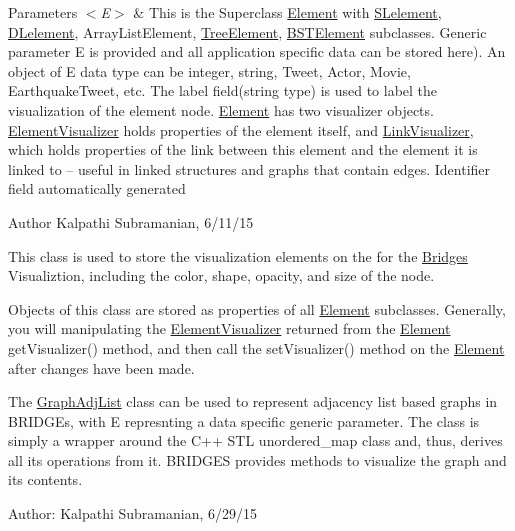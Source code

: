 \begin{DoxyParams}{Parameters}
{\em $<$\+E$>$} & This is the Superclass \hyperlink{classbridges_1_1_element}{Element} with \hyperlink{classbridges_1_1_s_lelement}{S\+Lelement}, \hyperlink{classbridges_1_1_d_lelement}{D\+Lelement}, Array\+List\+Element, \hyperlink{classbridges_1_1_tree_element}{Tree\+Element}, \hyperlink{classbridges_1_1_b_s_t_element}{B\+S\+T\+Element} subclasses. Generic parameter E is provided and all application specific data can be stored here). An object of E data type can be integer, string, Tweet, Actor, Movie, Earthquake\+Tweet, etc. The label field(string type) is used to label the visualization of the element node. \hyperlink{classbridges_1_1_element}{Element} has two visualizer objects. \hyperlink{classbridges_1_1_element_visualizer}{Element\+Visualizer} holds properties of the element itself, and \hyperlink{classbridges_1_1_link_visualizer}{Link\+Visualizer}, which holds properties of the link between this element and the element it is linked to -- useful in linked structures and graphs that contain edges. Identifier field automatically generated\\
\hline
\end{DoxyParams}
\begin{DoxyAuthor}{Author}
Kalpathi Subramanian, 6/11/15
\end{DoxyAuthor}
This class is used to store the visualization elements on the for the \hyperlink{classbridges_1_1_bridges}{Bridges} Visualiztion, including the color, shape, opacity, and size of the node. 

Objects of this class are stored as properties of all \hyperlink{classbridges_1_1_element}{Element} subclasses. Generally, you will manipulating the \hyperlink{classbridges_1_1_element_visualizer}{Element\+Visualizer} returned from the \hyperlink{classbridges_1_1_element}{Element} get\+Visualizer() method, and then call the set\+Visualizer() method on the \hyperlink{classbridges_1_1_element}{Element} after changes have been made.

The \hyperlink{classbridges_1_1_graph_adj_list}{Graph\+Adj\+List} class can be used to represent adjacency list based graphs in B\+R\+I\+D\+G\+Es, with E represnting a data specific generic parameter. The class is simply a wrapper around the C++ S\+T\+L unordered\+\_\+map class and, thus, derives all its operations from it. B\+R\+I\+D\+G\+E\+S provides methods to visualize the graph and its contents.

Author\+: Kalpathi Subramanian, 6/29/15


